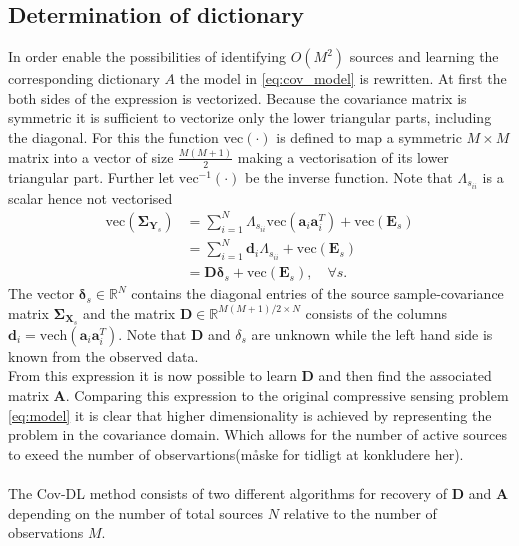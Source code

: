 \subsection{Determination of dictionary}
In order enable the possibilities of identifying $O(M^2)$ sources and learning the corresponding dictionary $A$ the model in \eqref{eq:cov_model} is rewritten.  
At first the both sides of the expression is vectorized. Because the covariance matrix is symmetric it is sufficient to vectorize only the lower triangular parts, including the diagonal. For this the function $\text{vec}(\cdot)$ is defined to map a symmetric $M\times M$ matrix into a vector of size $\frac{M(M+1)}{2}$ making a vectorisation of its lower triangular part. Further let $\text{vec}^{-1}(\cdot)$ be the inverse function. Note that $\Lambda_{s_{ii}}$ is a scalar hence not vectorised     
\begin{align}
\text{vec}(\boldsymbol{\Sigma}_{\mathbf{Y}_s}) &= \sum_{i=1}^N \Lambda_{s_{ii}} \text{vec}(\mathbf{a}_i \mathbf{a}_i^T) + \text{vec}(\mathbf{E}_s) \\
&= \sum_{i=1}^N \textbf{d}_i\Lambda_{s_{ii}} + \text{vec}(\mathbf{E}_s) \\
&= \mathbf{D} \boldsymbol{\delta}_s + \text{vec}(\mathbf{E}_s), \quad \forall s.
\end{align}
The vector $\boldsymbol{\delta}_s \in \mathbb{R}^{N}$ contains the diagonal entries of the source sample-covariance matrix $\boldsymbol{\Sigma}_{\mathbf{X}_s}$
and the matrix $\mathbf{D} \in \mathbb{R}^{M(M+1)/2 \times N}$ consists of the columns $\mathbf{d}_i = \text{vech}(\mathbf{a}_i \mathbf{a}_i^T)$. Note that $\textbf{D}$ and $\delta_s$ are unknown while the left hand side is known from the observed data.
\\
From this expression it is now possible to learn $\mathbf{D}$ and then find the associated matrix $\mathbf{A}$.
Comparing this expression to the original compressive sensing problem \eqref{eq:model} it is clear that higher dimensionality is   achieved by representing the problem in the covariance domain. Which allows for the number of active sources to exeed the number of observartions(måske for tidligt at konkludere her).\\
\\
The Cov-DL method consists of two different algorithms for  recovery of $\textbf{D}$ and $\textbf{A}$ depending on the number of total sources $N$ relative to the number of observations $M$. 

